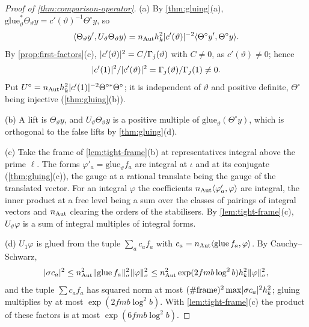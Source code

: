 \begin{proof}[Proof of \cref{thm:comparison-operator}]
(a) By \cref{thm:gluing}(a), $\mathrm{glue}_\vartheta^*\Theta_\vartheta y=c'(\vartheta)^{-1}\Theta^\circ y$, so
\[
  \langle\Theta_\vartheta y',U_\vartheta\Theta_\vartheta y\rangle=n_{\rm Aut}h_k^2\lvert c'(\vartheta)\rvert^{-2}\langle\Theta^\circ y',\Theta^\circ y\rangle.
\]
By \cref{prop:first-factors}(c), $\lvert c'(\vartheta)\rvert^2=C/\Gamma_j(\vartheta)$ with $C\ne0$, as $c'(\vartheta)\ne0$; hence
\[
  \lvert c'(1)\rvert^2/\lvert c'(\vartheta)\rvert^2=\Gamma_j(\vartheta)/\Gamma_j(1)\ne0.
\] Put $U^\circ=n_{\rm Aut}h_k^2\lvert c'(1)\rvert^{-2}\Theta^{\circ*}\Theta^\circ$; it is independent of $\vartheta$ and positive definite,
$\Theta^\circ$ being injective (\cref{thm:gluing}(b)).

(b) A lift is $\Theta_\vartheta y$, and $U_\vartheta\Theta_\vartheta y$ is a positive multiple of $\mathrm{glue}_\vartheta(\Theta^\circ y)$, which is orthogonal to the false lifts by \cref{thm:gluing}(d).

(c) Take the frame of \cref{lem:tight-frame}(b) at representatives integral above the prime $\ell$. The forms $\varphi'_a=\mathrm{glue}_\vartheta f_a$ are integral at $\iota$ and at its conjugate (\cref{thm:gluing}(c)), the gauge at a rational translate being the gauge
of the translated vector. For an integral $\varphi$ the coefficients $n_{\rm Aut}\langle\varphi'_a,\varphi\rangle$ are integral, the inner product at a free level being a sum over the classes of pairings of integral vectors and $n_{\rm Aut}$ clearing the
orders of the stabilisers. By \cref{lem:tight-frame}(c), $U_\vartheta\varphi$ is a sum of integral multiples of integral forms.

(d) $U_1\varphi$ is glued from the tuple $\sum_ac_af_a$ with $c_a=n_{\rm Aut}\langle\mathrm{glue}\,f_a,\varphi\rangle$. By Cauchy--Schwarz,
\[
  \lvert \sigma c_a\rvert^2\le n_{\rm Aut}^2\lVert \mathrm{glue}\,f_a\rVert_\sigma^2\lVert \varphi\rVert_\sigma^2\le n_{\rm Aut}^2\exp(2fmb\log^2b)h_k^2\lVert \varphi\rVert_\sigma^2,
\]
and the tuple
$\sum c_af_a$ has squared norm at most $(\#\text{frame})^2\max\lvert \sigma c_a\rvert^2h_k^2$; gluing multiplies by at most $\exp(2fmb\log^2b)$. With \cref{lem:tight-frame}(c) the product of these factors is at most $\exp(6fmb\log^2b)$.
\end{proof}

